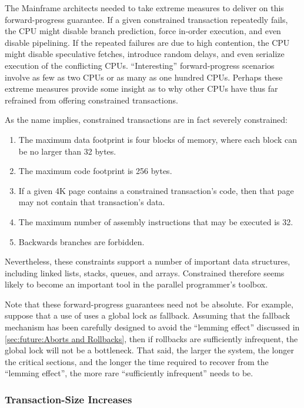 The Mainframe architects needed to take extreme measures to deliver on
this forward-progress guarantee.
If a given constrained transaction repeatedly fails, the CPU
might disable branch prediction, force in-order execution, and even
disable pipelining.
If the repeated failures are due to high contention, the CPU might
disable speculative fetches, introduce random delays, and even
serialize execution of the conflicting CPUs.
``Interesting'' forward-progress scenarios involve as few as two CPUs
or as many as one hundred CPUs.
Perhaps these extreme measures provide some insight as to why other CPUs
have thus far refrained from offering constrained transactions.

As the name implies, constrained transactions are in fact severely constrained:

\begin{enumerate}
\item	The maximum data footprint is four blocks of memory,
	where each block can be no larger than 32 bytes.
\item	The maximum code footprint is 256 bytes.
\item	If a given 4K page contains a constrained transaction's code,
	then that page may not contain that transaction's data.
\item	The maximum number of assembly instructions that may be executed
	is 32.
\item	Backwards branches are forbidden.
\end{enumerate}

Nevertheless, these constraints support a number of important data structures,
including linked lists, stacks, queues, and arrays.
Constrained  therefore seems likely to become an important tool in
the parallel programmer's toolbox.

Note that these forward-progress guarantees need not be absolute.
For example, suppose that a use of  uses a global lock as fallback.
Assuming that the fallback mechanism has been carefully designed to
avoid the ``lemming effect'' discussed in
\cref{sec:future:Aborts and Rollbacks},
then if  rollbacks are sufficiently infrequent, the global lock
will not be a bottleneck.
That said, the larger the system, the longer the critical sections,
and the longer the time required to recover from the ``lemming effect'',
the more rare ``sufficiently infrequent'' needs to be.

\subsubsection{Transaction-Size Increases}
\label{sec:future:Transaction-Size Increases}

